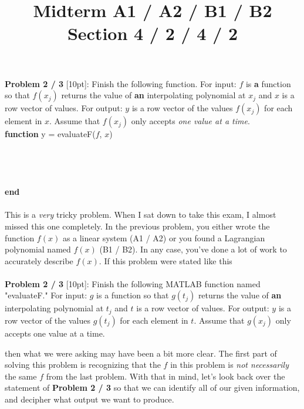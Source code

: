 \documentclass{article}
\begin{document}
 
 
 
\title{
    \textmd{\Huge{Midterm A1 / A2 / B1 / B2 }}\\
    \textmd{\huge{Section 4 / 2 / 4 / 2}}
}


\maketitle


\textbf{Problem 2 / 3} [10pt]: Finish the following function. For input: $f$ is \textbf{a} function so that $f(x_j)$ returns the value of \textbf{an} interpolating polynomial at $x_j$ and $x$ is a row vector of values. For output: $y$ is a row vector of the values $f(x_j)$ for each element in $x$. Assume that $f(x_j)$ only accepts \textit{one value at a time}.\\

\textbf{function} y = evaluateF($f$, $x$)\\
\\
\\
\\ 
\\ 

\textbf{end} \\
\\


This is a \textit{very} tricky problem. When I sat down to take this exam, I almost missed this one completely. In the previous problem, you either wrote the function $f(x)$ as a linear system (A1 / A2) or you found a Lagrangian polynomial named $f(x)$  (B1 / B2). In any case, you've done a lot of work to accurately describe $f(x)$. If this problem were stated like this \\
\\

\textbf{Problem 2 / 3} [10pt]: Finish the following MATLAB function named "evaluateF." For input: $g$ is a function so that $g(t_j)$ returns the value of \textbf{an} interpolating polynomial at $t_j$ and $t$ is a row vector of values. For output: $y$ is a row vector of the values $g(t_j)$ for each element in $t$. Assume that $g(x_j)$ only accepts one value at a time.

 


{\setlength{\parindent}{0cm}
then what we were asking may have been a bit more clear. The first part of solving this problem is recognizing that the $f$ in this problem is \textit{not necessarily} the same $f$ from the last problem. With that in mind, let's look back over the statement of \textbf{Problem 2 / 3} so that we can identify all of our given information, and decipher what output we want to produce.}\\
\end{document}
